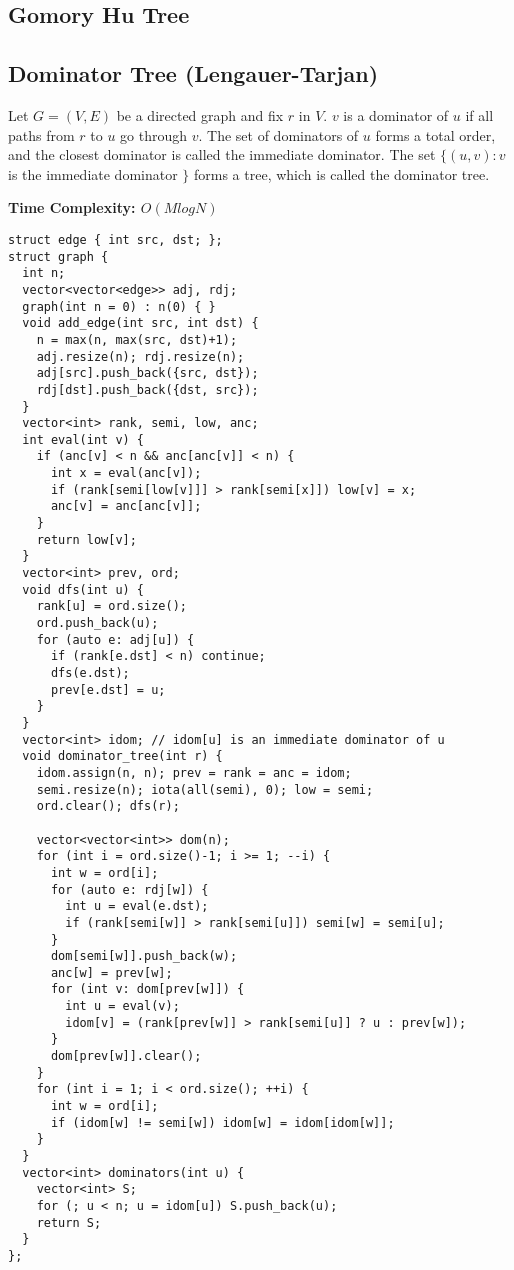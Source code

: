 \subsection{Gomory Hu Tree}

\newpage

\subsection{Dominator Tree (Lengauer-Tarjan)}

Let $G = (V, E)$ be a directed graph and fix $r$ in $V$.
$v$ is a dominator of $u$ if all paths from $r$ to $u$ go through $v$.
The set of dominators of $u$ forms a total order, and 
the closest dominator is called the immediate dominator.
The set $\{ (u,v) : v$ is the immediate dominator $\}$ forms a tree, 
which is called the dominator tree. \cite{TarjanLengauer1979Jan}


\textbf{Time Complexity: $O(M log N)$}\\
\begin{lstlisting}
struct edge { int src, dst; };
struct graph {
  int n;
  vector<vector<edge>> adj, rdj;
  graph(int n = 0) : n(0) { } 
  void add_edge(int src, int dst) {
    n = max(n, max(src, dst)+1);
    adj.resize(n); rdj.resize(n);
    adj[src].push_back({src, dst});
    rdj[dst].push_back({dst, src});
  }
  vector<int> rank, semi, low, anc;
  int eval(int v) { 
    if (anc[v] < n && anc[anc[v]] < n) {
      int x = eval(anc[v]);
      if (rank[semi[low[v]]] > rank[semi[x]]) low[v] = x;
      anc[v] = anc[anc[v]];
    }
    return low[v];
  }
  vector<int> prev, ord;
  void dfs(int u) {
    rank[u] = ord.size();
    ord.push_back(u);
    for (auto e: adj[u]) {
      if (rank[e.dst] < n) continue;
      dfs(e.dst);
      prev[e.dst] = u;
    }
  }
  vector<int> idom; // idom[u] is an immediate dominator of u
  void dominator_tree(int r) {
    idom.assign(n, n); prev = rank = anc = idom;
    semi.resize(n); iota(all(semi), 0); low = semi;
    ord.clear(); dfs(r);

    vector<vector<int>> dom(n);
    for (int i = ord.size()-1; i >= 1; --i) {
      int w = ord[i];
      for (auto e: rdj[w]) {
        int u = eval(e.dst);
        if (rank[semi[w]] > rank[semi[u]]) semi[w] = semi[u];
      }
      dom[semi[w]].push_back(w);
      anc[w] = prev[w];
      for (int v: dom[prev[w]]) {
        int u = eval(v);
        idom[v] = (rank[prev[w]] > rank[semi[u]] ? u : prev[w]);
      }
      dom[prev[w]].clear();
    }
    for (int i = 1; i < ord.size(); ++i) {
      int w = ord[i];
      if (idom[w] != semi[w]) idom[w] = idom[idom[w]];
    }
  }
  vector<int> dominators(int u) {
    vector<int> S;
    for (; u < n; u = idom[u]) S.push_back(u);
    return S;
  }
};
\end{lstlisting}